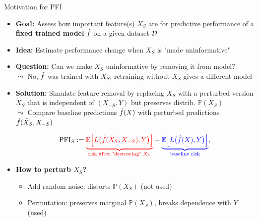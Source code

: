 \documentclass[10pt,compress,t,notes=noshow, xcolor=table]{beamer}
\begin{document}
\begin{frame}{Motivation for PFI}


\begin{itemize}
  \item<1-> \textbf{Goal:} Assess how important feature(s) $X_S$ are for predictive performance of a \textbf{fixed trained model} $\hat{f}$ on a given dataset $\mathcal{D}$
  \item<1-> \textbf{Idea:} Estimate performance change when $X_S$ is "made uninformative"
  \item<2-> \textbf{Question:} Can we make $X_S$ uninformative by removing it from  model?\\
  $\leadsto$ No, $\hat{f}$ was trained with $X_S$; retraining without $X_S$ gives a  different model
  \item<3-> 
\textbf{Solution:} Simulate feature removal by replacing $X_S$ with a perturbed version $\tilde{X}_S$ that is independent of $(X_{-S}, Y)$ but preserves distrib. $\mathbb{P}(X_S)$\\
  $\leadsto$ Compare {\color{blue}baseline predictions $\hat{f}(X)$} with {\color{red}perturbed predictions $\hat{f}(\tilde{X}_S, X_{-S})$}
  
  

\[
\text{PFI}_S :=
 {\color{red}\underbrace{\mathbb{E}\Big[L\big(\hat{f}(\tilde{X}_S, X_{-S}), Y\big)\Big]}_{\text{risk after "destroying" }X_S}}
 -
 {\color{blue}\underbrace{\mathbb{E}\Big[L\big(\hat{f}(X), Y\big)\Big]}_{\text{baseline risk}}},
\]
  \item<3-> \textbf{How to perturb $X_S$?}
  \begin{itemize}
    \item Add random noise: distorts $\mathbb{P}(X_S)$ (not used)
    \item Permutation: preserves marginal $\mathbb{P}(X_S)$, breaks dependence with $Y$ (used)
  \end{itemize}

\end{itemize}

\end{frame}
\end{document}
